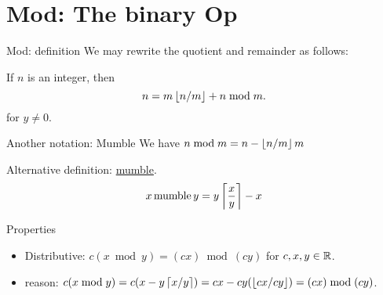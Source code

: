 \section{Mod: The binary Op}

\begin{frame}{Mod: definition}
    We may rewrite the quotient and remainder as follows: 

    If $n$ is an integer, then $$n=m\left \lfloor n/m \right\rfloor+n\bmod m.$$ for $y\neq 0$. 


    
\end{frame}

\begin{frame}{Another notation: Mumble}
    We have $n \bmod m = n - \left \lfloor n/m \right\rfloor m$

    Alternative definition: \underline{mumble}. 
    $$
    x \operatorname{ mumble } y = y \left \lceil {x\over y} \right\rceil -x
    $$
\end{frame}

\begin{frame}{Properties}
    \begin{itemize}
        \item Distributive: $c(x\bmod y) = (cx) \bmod (cy)$
        for $c,x,y\in \mathbb{R}$. 
        \item reason: $c(x\bmod y) = c(x-y\left \lceil x/y \right\rceil)=cx-cy(\left \lfloor cx/cy \right\rfloor) = (cx) \bmod (cy)$. 
    \end{itemize}
\end{frame}

